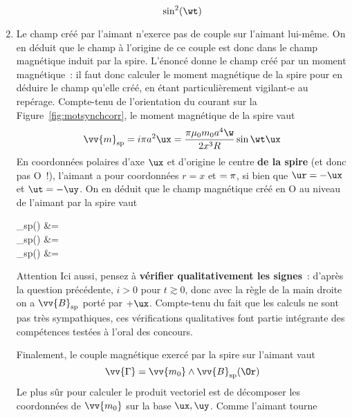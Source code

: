 \documentclass[a4paper, 10pt, final, garamond]{book}
\begin{document}
\begin{enumerate}
\[{			      \sin^2(\wt)}
	      \]
	\item Le champ créé par l'aimant n'exerce pas de couple sur l'aimant lui-même.
	      On en déduit que le champ à l'origine de ce couple est donc dans le
	      champ magnétique induit par la spire. L'énoncé donne le champ créé par
	      un moment magnétique~: il faut donc calculer le moment magnétique de la
	      spire pour en déduire le champ qu'elle créé, en étant particulièrement
	      vigilant-e au repérage. Compte-tenu de l'orientation du courant sur la
	      Figure~\ref{fig:motsynchcorr}, le moment magnétique de la spire vaut
	      \[
		      \vv{m}_{\rm sp} = i\pi a^2 \ux = \frac{\pi \mu_0 m_0 a^4\w}{2x^3R}
		      \sin{\wt} \ux
	      \]
	      En coordonnées polaires d'axe $\ux$ et d'origine le centre \textbf{de la
		      spire} (et donc pas O~!), l'aimant a pour coordonnées $r =x$ et $\tt =
		      \pi$, si bien que $\ur = -\ux$ et $\ut = -\uy$. On en déduit que le
	      champ magnétique créé en O au niveau de l'aimant par la spire vaut
	      \begin{DispWithArrows*}[]
		      _{\rm sp}(\Or) &=
		      \left[ 2 \underbracket{\cos(\pi)}_{=-1}(-\ux)
			      + \underbracket{\sin(\pi)}_{=0}(-\uy) \right]
		      \\\Lra
		      _{\rm sp}(\Or) &=
		       \times {}
		      \sin{\wt}  \ux
		      \\\Lra
		      _{\rm sp}(\Or) &=
		       \sin{\wt}\ux
	      \end{DispWithArrows*}
	      \begin{tror}{Attention}
		      Ici aussi, pensez à \textbf{vérifier qualitativement les signes}~:
		      d'après la question précédente, $i>0$ pour $t \gtrsim 0$, donc avec la
		      règle de la main droite on a $\vv{B}_{\rm sp}$ porté par $+\ux$.
		      \smallbreak
		      Compte-tenu du fait que les calculs ne sont pas très sympathiques, ces
		      vérifications qualitatives font partie intégrante des compétences
		      testées à l'oral des concours.
	      \end{tror}
	      Finalement, le couple magnétique exercé par la spire sur l'aimant vaut
	      \[
		      \vv{\Gamma} = \vv{m_0} \wedge \vv{B}_{\rm sp} (\Or)
	      \]
	      Le plus sûr pour calculer le produit vectoriel est de décomposer les
	      coordonnées de $\vv{m_0}$ sur la base $\ux, \uy$. Comme l'aimant tourne

\end{enumerate}
\end{document}
